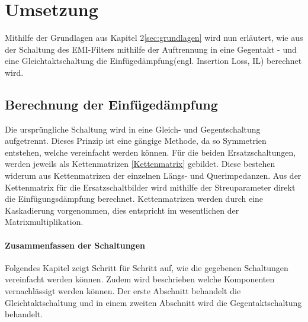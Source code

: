 \section{Umsetzung} \label{sec:umsetzung}
Mithilfe der Grundlagen aus Kapitel 2\ref{sec:grundlagen} wird nun erläutert, wie aus der Schaltung des EMI-Filters mithilfe der Auftrennung in eine Gegentakt - und eine Gleichtaktschaltung die Einfügedämpfung(engl. Insertion Loss, IL) berechnet wird. 

\subsection{Berechnung der Einfügedämpfung} \label{subsec:einfugedampfung}

Die ursprüngliche Schaltung wird in eine Gleich- und Gegentschaltung aufgetrennt. Dieses Prinzip ist eine gängige Methode, da so Symmetrien entstehen, welche vereinfacht werden können. Für die beiden Ersatzschaltungen, werden jeweils als Kettenmatrizen \ref{Kettenmatrix} gebildet. Diese bestehen widerum aus Kettenmatrizen der einzelnen Längs- und Querimpedanzen. Aus der Kettenmatrix für die Ersatzschaltbilder wird mithilfe der Streuparameter direkt die Einfügungsdämpfung berechnet. Kettenmatrizen werden durch eine Kaskadierung vorgenommen, dies entspricht im wesentlichen der Matrixmultiplikation. \\


\paragraph{Zusammenfassen der Schaltungen} \label{par:zusammenfassungSchaltung}
Folgendes Kapitel zeigt Schritt für Schritt auf, wie die gegebenen Schaltungen vereinfacht werden können. Zudem wird beschrieben welche Komponenten vernachlässigt werden können. Der erste Abschnitt behandelt die Gleichtaktschaltung und in einem zweiten Abschnitt wird die Gegentaktschaltung behandelt.

